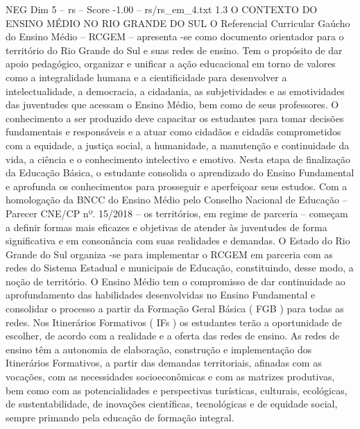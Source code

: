 \begin{textsample}{NEG Dim 5 – rs – Score -1.00 – rs/rs\_em\_4.txt}  \label{ex:f5_neg_025}
1.3 O CONTEXTO DO ENSINO MÉDIO NO RIO GRANDE DO SUL O Referencial Curricular Gaúcho do Ensino Médio – RCGEM – apresenta -se como documento orientador para o território do Rio Grande do Sul e suas redes de ensino.
Tem o propósito de dar apoio pedagógico, organizar e unificar a ação educacional em torno de valores como a integralidade humana e a cientificidade para desenvolver a intelectualidade, a democracia, a cidadania, as subjetividades e as emotividades das juventudes que acessam o Ensino Médio, bem como de seus professores.
O conhecimento a ser produzido deve capacitar os estudantes para tomar decisões fundamentais e responsáveis e a atuar como cidadãos e cidadãs comprometidos com a equidade, a justiça social, a humanidade, a manutenção e continuidade da vida, a ciência e o conhecimento intelectivo e emotivo.
Nesta etapa de finalização da Educação Básica, o estudante consolida o aprendizado do Ensino Fundamental e aprofunda os conhecimentos para prosseguir e aperfeiçoar seus estudos.
Com a homologação da BNCC do Ensino Médio pelo Conselho Nacional de Educação – Parecer CNE/CP nº. 15/2018 – os territórios, em regime de parceria – começam a definir formas mais eficazes e objetivas de atender às juventudes de forma significativa e em consonância com suas realidades e demandas.
O Estado do Rio Grande do Sul organiza -se para implementar o RCGEM em parceria com as redes do Sistema Estadual e municipais de Educação, constituindo, desse modo, a noção de território.
O Ensino Médio tem o compromisso de dar continuidade ao aprofundamento das habilidades desenvolvidas no Ensino Fundamental e consolidar o processo a partir da Formação Geral Básica ( FGB ) para todas as redes.
Nos Itinerários Formativos ( IFs ) os estudantes terão a oportunidade de escolher, de acordo com a realidade e a oferta das redes de ensino.
As redes de ensino têm a autonomia de elaboração, construção e implementação dos Itinerários Formativos, a partir das demandas territoriais, afinadas com as vocações, com as necessidades socioeconômicas e com as matrizes produtivas, bem como com as potencialidades e perspectivas turísticas, culturais, ecológicas, de sustentabilidade, de inovações científicas, tecnológicas e de equidade social, sempre primando pela educação de formação integral.

\end{textsample}
